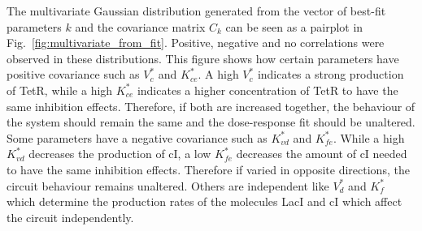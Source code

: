 The multivariate Gaussian distribution generated from the vector of best-fit parameters $k$ and the covariance matrix $C_{k}$ can be seen as a pairplot in Fig.~\ref{fig:multivariate_from_fit}.
Positive, negative and no correlations were observed in these distributions.
This figure shows how certain parameters have positive covariance such as $V^*_c$ and $K^*_{ce}$.
A high $V^*_c$ indicates a strong production of TetR, while a high $K^*_{ce}$ indicates a higher concentration of TetR to have the same inhibition effects.
Therefore, if both are increased together, the behaviour of the system should remain the same and the dose-response fit should be unaltered.
Some parameters have a negative covariance such as $K^*_{vd}$ and $K^*_{fe}$.
While a high $K^*_{vd}$ decreases the production of cI, a low $K^*_{fe}$ decreases the amount of cI needed to have the same inhibition effects.
Therefore if varied in opposite directions, the circuit behaviour remains unaltered.
Others are independent like $V^*_{d}$ and $K^*_{f}$ which determine the production rates of the molecules LacI and cI which affect the circuit independently.

